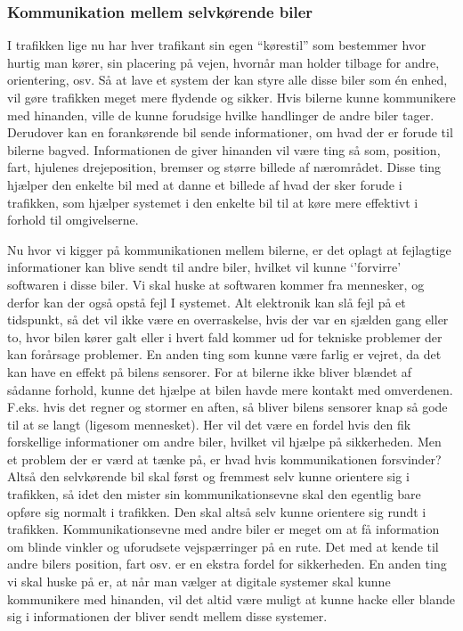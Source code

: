 
\subsubsection{Kommunikation mellem selvkørende biler}

I trafikken lige nu har hver trafikant sin egen ``kørestil'' som bestemmer hvor hurtig man kører, sin placering på vejen, hvornår man holder tilbage for andre, orientering, osv. Så at lave et system der kan styre alle disse biler som \'en enhed, vil gøre trafikken meget mere flydende og sikker. Hvis bilerne kunne kommunikere med hinanden, ville de kunne forudsige hvilke handlinger de andre biler tager. Derudover kan en forankørende bil sende informationer, om hvad der er forude til bilerne bagved. Informationen de giver hinanden vil være ting så som, position, fart, hjulenes drejeposition, bremser og større billede af nærområdet. Disse ting hjælper den enkelte bil med at danne et billede af hvad der sker forude i trafikken, som hjælper systemet i den enkelte bil til at køre mere effektivt i forhold til omgivelserne. 

Nu hvor vi kigger på kommunikationen mellem bilerne, er det oplagt at fejlagtige informationer kan blive sendt til andre biler, hvilket vil kunne `'forvirre' softwaren i disse biler. Vi skal huske at  softwaren kommer fra mennesker, og derfor kan der også opstå fejl I systemet. Alt elektronik kan slå fejl på et tidspunkt, så det vil ikke være en overraskelse, hvis der var en sjælden gang eller to, hvor bilen kører galt eller i hvert fald kommer ud for tekniske problemer der kan forårsage problemer. En anden ting som kunne være farlig er vejret, da det kan have en effekt på bilens sensorer. For at bilerne ikke bliver blændet af sådanne forhold, kunne det hjælpe at bilen havde mere kontakt med omverdenen. F.eks. hvis det regner og stormer en aften, så bliver bilens sensorer knap så gode til at se langt (ligesom mennesket). Her vil det være en fordel hvis den fik forskellige informationer om andre biler, hvilket vil hjælpe på sikkerheden. Men et problem der er værd at tænke på, er hvad hvis kommunikationen forsvinder? Altså den selvkørende bil skal først og fremmest selv kunne orientere sig i trafikken, så idet den mister sin kommunikationsevne skal den egentlig bare opføre sig normalt i trafikken. Den skal altså selv kunne orientere sig rundt i trafikken. Kommunikationsevne med andre biler er meget om at få information om blinde vinkler og uforudsete vejspærringer på en rute. Det med at kende til andre bilers position, fart osv. er en ekstra fordel for sikkerheden. En anden ting vi skal huske på er, at når man vælger at digitale systemer skal kunne kommunikere med hinanden, vil det altid være muligt at kunne hacke eller blande sig i informationen der bliver sendt mellem disse systemer. \cite{car_to_car}
